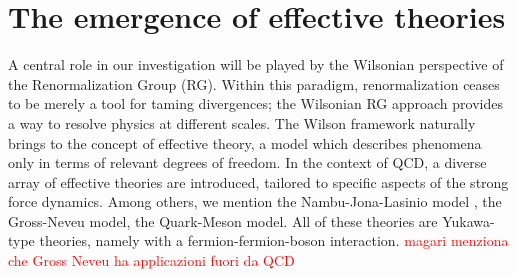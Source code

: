 \section{The emergence of effective theories}
A central role in our investigation will be played by the Wilsonian perspective of the Renormalization Group (RG). Within this paradigm, renormalization ceases to be merely a tool for taming divergences; 
the Wilsonian RG approach provides a way to resolve physics at different scales. The Wilson framework naturally brings to the concept of effective theory, a model which describes phenomena only in terms of relevant degrees of freedom. In the context of QCD, a diverse array of effective theories are introduced, tailored to specific aspects of the strong force dynamics. 
Among others, we mention the Nambu-Jona-Lasinio model \cite{Nambu1961DynamicalI, Nambu1961DynamicalII}, the Gross-Neveu model, the Quark-Meson model. All of these theories are Yukawa-type theories, namely with a fermion-fermion-boson interaction.
\textcolor{red}{magari menziona che Gross Neveu ha applicazioni fuori da QCD}
\newpage 
